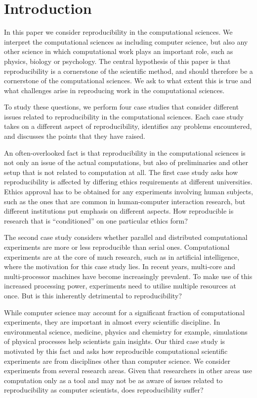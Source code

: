 \section{Introduction}
\label{s:intro}


In this paper we consider reproducibility in the computational sciences. We
interpret the computational sciences as including computer science, but also any
other science in which computational work plays an important role, such as
physics, biology or psychology. The central hypothesis of this paper is that
reproducibility is a cornerstone of the scientific method, and should therefore
be a cornerstone of the computational sciences. We ask to what extent this is true
and what challenges arise in reproducing work in the computational sciences.

To study these questions, we perform four case studies that consider different
issues related to reproducibility in the computational sciences.  Each case study
takes on a different aspect of reproducibility, identifies any problems
encountered, and discusses the points that they have raised.

An often-overlooked fact is that reproducibility in the computational sciences
is not only an issue of the actual computations, but also of preliminaries and
other setup that is not related to computation at all. The first case study asks
how reproducibility is affected by differing ethics requirements at different
universities. Ethics approval has to be obtained for any experiments involving
human subjects, such as the ones that are common in human-computer interaction
research, but different institutions put emphasis on different aspects. How
reproducible is research that is ``conditioned'' on one particular ethics form?

The second case study considers whether parallel and distributed computational
experiments are more or less reproducible than serial ones. Computational
experiments are at the core of much research, such as in artificial
intelligence, where the motivation for this case study lies. In recent years,
multi-core and multi-processor machines have become increasingly prevalent. To
make use of this increased processing power, experiments need to utilise
multiple resources at once. But is this inherently detrimental to
reproducibility?

While computer science may account for a significant fraction of computational
experiments, they are important in almost every scientific discipline. In environmental science, 
medicine, physics and chemistry for example, simulations of physical processes help scientists gain
insights. Our third case study is motivated by this fact and asks how
reproducible computational scientific experiments are from disciplines other than
computer science. We consider experiments from several research areas. Given
that researchers in other areas use computation only as a tool and may not be
as aware of issues related to reproducibility as computer scientists, does
reproducibility suffer?

